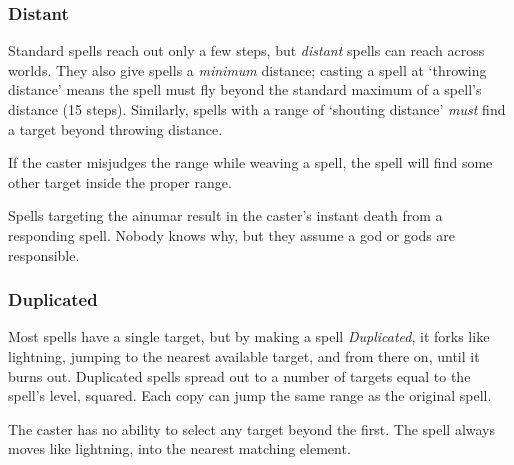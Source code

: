 \begin{multicols}{2}
\subsubsection{Distant}

Standard spells reach out only a few steps, but \textit{distant} spells can reach across worlds.
They also give spells a \emph{minimum} distance; casting a spell at `throwing distance' means the spell must fly beyond the standard maximum of a spell's distance (15 steps).
Similarly, spells with a range of `shouting distance' \emph{must} find a target beyond throwing distance.


If the caster misjudges the range while weaving a spell, the spell will find some other target inside the proper range.

Spells targeting the \gls{ainumar} result in the caster's instant death from a responding spell.
Nobody knows why, but they assume a god or gods are responsible.

\subsubsection{Duplicated}

Most spells have a single target, but by making a spell \textit{Duplicated}, it forks like lightning, jumping to the nearest available target, and from there on, until it burns out.
Duplicated spells spread out to a number of targets equal to the spell's level, squared.
Each copy can jump the same range as the original spell.

The caster has no ability to select any target beyond the first.
The spell always moves like lightning, into the nearest matching element.



\end{multicols}
